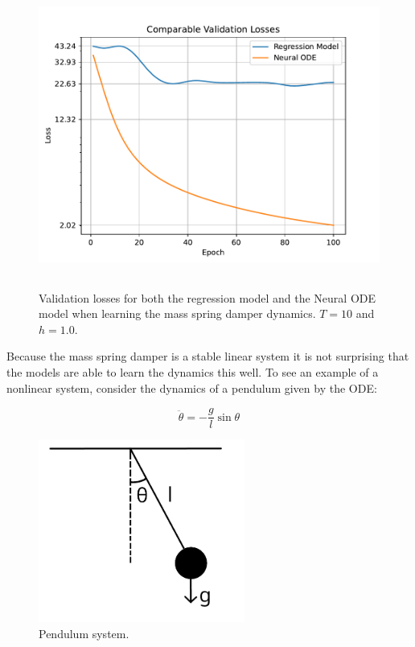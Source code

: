 \documentclass[12pt,a4paper]{book}
\begin{document}
\begin{figure}[H]
    \centering
    \includegraphics[height=10cm]{figs/plots/basic_experiments/mass_spring_damper_loss_comparison_h1_T10.pdf}
    \caption{Validation losses for both the regression model and the Neural ODE model when learning the mass spring damper dynamics. $T = 10$ and $h = 1.0$.}
    \label{fig:mass_spring_damper_loss_comparison_h1_T10}
\end{figure}

Because the mass spring damper is a stable linear system it is not surprising that the models are able to learn the dynamics this well. To see an example of a nonlinear system, consider the dynamics of a pendulum given by the ODE:

\begin{equation}
    \ddot{\theta} = - \frac{g}{l} \sin{\theta}
    \label{eq:single_pendulum_ode_secondorder}
\end{equation}

\begin{figure}[H]
    \centering
    \includegraphics[height=6cm]{figs/singlependulum.png}
    \caption{Pendulum system.}
    \label{fig:singlependulum}
\end{figure}
\end{document}
